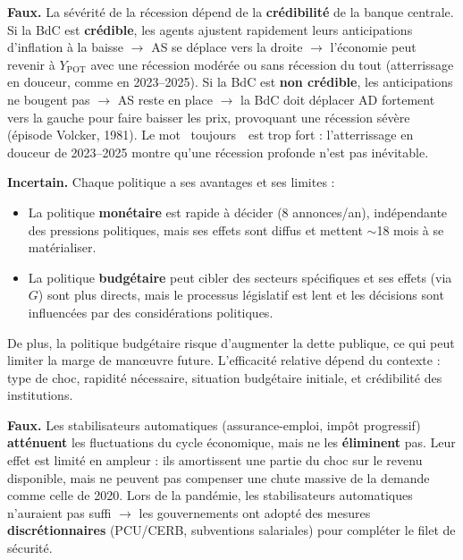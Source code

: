 \begin{reponse}
\textbf{Faux.} La sévérité de la récession dépend de la \textbf{crédibilité} de la banque centrale. Si la BdC est \textbf{crédible}, les agents ajustent rapidement leurs anticipations d'inflation à la baisse $\to$ AS se déplace vers la droite $\to$ l'économie peut revenir à $Y_{\text{POT}}$ avec une récession modérée ou sans récession du tout (atterrissage en douceur, comme en 2023--2025). Si la BdC est \textbf{non crédible}, les anticipations ne bougent pas $\to$ AS reste en place $\to$ la BdC doit déplacer AD fortement vers la gauche pour faire baisser les prix, provoquant une récession sévère (épisode Volcker, 1981). Le mot \guillemotleft~toujours~\guillemotright\ est trop fort : l'atterrissage en douceur de 2023--2025 montre qu'une récession profonde n'est pas inévitable.
\end{reponse}



\begin{reponse}
\textbf{Incertain.} Chaque politique a ses avantages et ses limites :
\begin{itemize}
   \item La politique \textbf{monétaire} est rapide à décider (8 annonces/an), indépendante des pressions politiques, mais ses effets sont diffus et mettent $\sim$18 mois à se matérialiser.
   \item La politique \textbf{budgétaire} peut cibler des secteurs spécifiques et ses effets (via $G$) sont plus directs, mais le processus législatif est lent et les décisions sont influencées par des considérations politiques.
\end{itemize}
De plus, la politique budgétaire risque d'augmenter la dette publique, ce qui peut limiter la marge de man{\oe}uvre future. L'efficacité relative dépend du contexte : type de choc, rapidité nécessaire, situation budgétaire initiale, et crédibilité des institutions.
\end{reponse}


\begin{reponse}
\textbf{Faux.} Les stabilisateurs automatiques (assurance-emploi, impôt progressif) \textbf{atténuent} les fluctuations du cycle économique, mais ne les \textbf{éliminent} pas. Leur effet est limité en ampleur : ils amortissent une partie du choc sur le revenu disponible, mais ne peuvent pas compenser une chute massive de la demande comme celle de 2020. Lors de la pandémie, les stabilisateurs automatiques n'auraient pas suffi $\to$ les gouvernements ont adopté des mesures \textbf{discrétionnaires} (PCU/CERB, subventions salariales) pour compléter le filet de sécurité.
\end{reponse}

